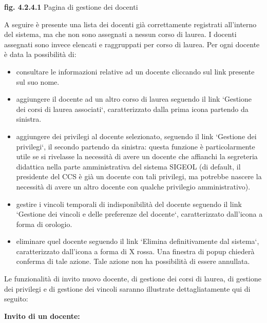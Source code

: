 \documentclass[11pt,a4paper]{article}
\begin{document}
\bigskip
\begin{center}
	\textbf{fig. 4.2.4.1} Pagina di gestione dei docenti\\
\end{center}
\bigskip

A seguire è presente una lista dei docenti già correttamente registrati all'interno del sistema, ma che non sono assegnati a nessun corso di laurea.
I docenti assegnati sono invece elencati e raggruppati per corso di laurea.
Per ogni docente è data la possibilità di:
\begin{itemize}
 \item consultare le informazioni relative ad un docente cliccando sul link presente sul suo nome.
 \item aggiungere il docente ad un altro corso di laurea seguendo il link `Gestione dei corsi di laurea associati`, caratterizzato dalla prima icona partendo da sinistra.
 \item aggiungere dei privilegi al docente selezionato, seguendo il link `Gestione dei privilegi`, il secondo partendo da sinistra: questa funzione è particolarmente utile se si rivelasse la necessità di avere un docente che affianchi la segreteria didattica nella parte amministrativa del sistema SIGEOL (di default, il presidente del CCS è già un docente con tali privilegi, ma potrebbe nascere la necessità di avere un altro docente con qualche privilegio amministrativo).
 \item gestire i vincoli temporali di indisponibilità del docente seguendo il link `Gestione dei vincoli e delle preferenze del docente`, caratterizzato dall'icona a forma di orologio.
 \item eliminare quel docente seguendo il link `Elimina definitivamente dal sistema`, caratterizzato dall'icona a forma di X rossa. Una finestra di popup chiederà conferma di tale azione. Tale azione non ha possibilità di essere annullata.
\end{itemize}

Le funzionalità di invito nuovo docente, di gestione dei corsi di laurea, di gestione dei privilegi e di gestione dei vincoli saranno illustrate dettagliatamente qui di seguito:
\newline \newline
\begin{large}\textbf{Invito di un docente:}\end{large}
\end{document}
